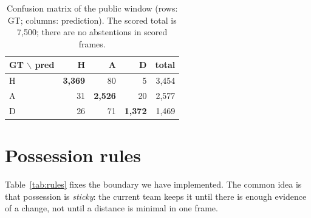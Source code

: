 \documentclass[10pt,a4paper]{article}
\begin{document}
\begin{table}[t]
\centering
\small
\caption{Confusion matrix of the public window (rows: GT; columns: prediction). The scored
total is 7,500; there are no abstentions in scored frames.}
\label{tab:confusion}
\begin{tabular}{lrrrr}
\toprule
GT $\backslash$ pred & H & A & D & total \\
\midrule
H & \textbf{3,369} & 80 & 5 & 3,454 \\
A & 31 & \textbf{2,526} & 20 & 2,577 \\
D & 26 & 71 & \textbf{1,372} & 1,469 \\
\bottomrule
\end{tabular}
\end{table}
\section{Possession rules}
\label{sec:reglas}

Table~\ref{tab:rules} fixes the boundary we have implemented. The common idea is that
possession is \emph{sticky}: the current team keeps it until there is enough evidence of a
change, not until a distance is minimal in one frame.
\end{document}
